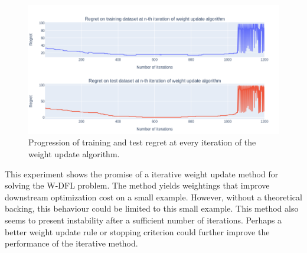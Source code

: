 \begin{figure}
    \centering
    \includegraphics[width=\textwidth]{res/img/iterative.png}
    \caption{Progression of training and test regret at every iteration of the weight update algorithm.}
    \label{fig:eval:iterative-regret}
\end{figure}

This experiment shows the promise of a iterative weight update method for solving the W-DFL problem. The method yields weightings that improve downstream optimization cost on a small example. However, without a theoretical backing, this behaviour could be limited to this small example. This method also seems to present instability after a sufficient number of iterations. Perhaps a better weight update rule or stopping criterion could further improve the performance of the iterative method.


